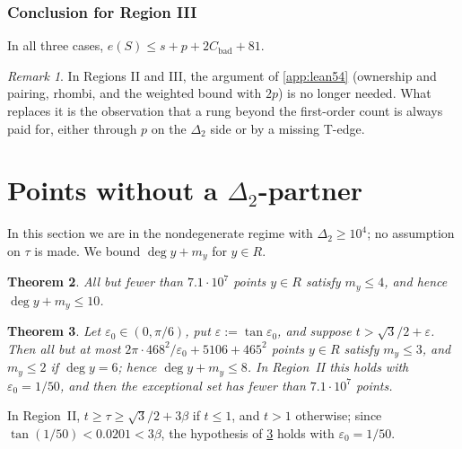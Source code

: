 \documentclass[11pt]{amsart}
\newtheorem{theorem}{Theorem}[section]
\theoremstyle{definition}
\theoremstyle{remark}
\newtheorem{remark}[theorem]{Remark}
\newcommand{\Dt}{\Delta_2}
\newcommand{\eps}{\varepsilon}
\begin{document}
\subsubsection*{Conclusion for Region III}
In all three cases, $e(S)\le s+p+2C_{\mathrm{bad}}+81$.

\begin{remark}
In Regions II and III, the argument of \cref{app:lean54} (ownership and pairing, rhombi, and the weighted bound with $2p$) is no longer needed. What replaces it is the observation that a rung beyond the first-order count is always paid for, either through $p$ on the $\Dt$ side or by a missing T-edge.
\end{remark}

\section{Points without a \texorpdfstring{$\Dt$}{Delta2}-partner}\label{sec:Rpoints}

In this section we are in the nondegenerate regime with $\Dt\ge10^4$; no assumption on $\tau$ is made. We bound $\deg y+m_y$ for $y\in R$.

\begin{theorem}\label{thm:N1}
All but fewer than $7.1\cdot10^7$ points $y\in R$ satisfy $m_y\le4$, and hence $\deg y+m_y\le10$.
\end{theorem}

\begin{theorem}\label{thm:N2}
Let $\eps_0\in(0,\pi/6)$, put $\eps:=\tan\eps_0$, and suppose $t>\sqrt3/2+\eps$. Then all but at most $2\pi\cdot468^2/\eps_0+5106+465^2$ points $y\in R$ satisfy $m_y\le3$, and $m_y\le2$ if $\deg y=6$; hence $\deg y+m_y\le8$. In Region~II this holds with $\eps_0=1/50$, and then the exceptional set has fewer than $7.1\cdot10^7$ points.
\end{theorem}
In Region~II, $t\ge\tau\ge\sqrt3/2+3\beta$ if $t\le1$, and $t>1$ otherwise; since $\tan(1/50)<0.0201<3\beta$, the hypothesis of \cref{thm:N2} holds with $\eps_0=1/50$.
\end{document}
